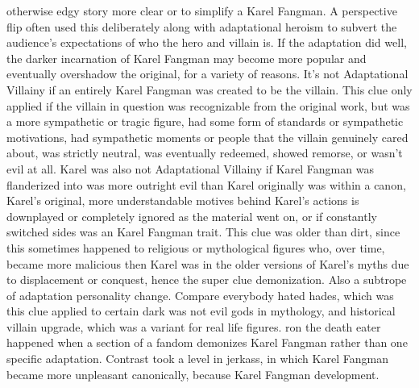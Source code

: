 \documentclass[12pt]{book}
\begin{document}
otherwise edgy story more clear or to simplify a Karel Fangman. A perspective flip often used this deliberately along with adaptational heroism to subvert the audience's expectations of who the hero and villain is. If the adaptation did well, the darker incarnation of Karel Fangman may become more popular and eventually overshadow the original, for a variety of reasons. It's not Adaptational Villainy if an entirely Karel Fangman was created to be the villain. This clue only applied if the villain in question was recognizable from the original work, but was a more sympathetic or tragic figure, had some form of standards or sympathetic motivations, had sympathetic moments or people that the villain genuinely cared about, was strictly neutral, was eventually redeemed, showed remorse, or wasn't evil at all. Karel was also not Adaptational Villainy if Karel Fangman was flanderized into was more outright evil than Karel originally was within a canon, Karel's original, more understandable motives behind Karel's actions is downplayed or completely ignored as the material went on, or if constantly switched sides was an Karel Fangman trait. This clue was older than dirt, since this sometimes happened to religious or mythological figures who, over time, became more malicious then Karel was in the older versions of Karel's myths due to displacement or conquest, hence the super clue demonization. Also a subtrope of adaptation personality change. Compare everybody hated hades, which was this clue applied to certain dark was not evil gods in mythology, and historical villain upgrade, which was a variant for real life figures. ron the death eater happened when a section of a fandom demonizes Karel Fangman rather than one specific adaptation. Contrast took a level in jerkass, in which Karel Fangman became more unpleasant canonically, because Karel Fangman development.
\end{document}
